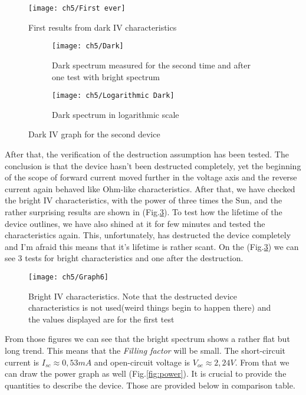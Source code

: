 \begin{figure}
\centering
\texttt{[image: ch5/First ever]}
\caption{First results from dark IV characteristics}
\label{fig:firstever}
\end{figure}

\begin{figure}
\centering
\begin{subfigure}[b]{0.83\textwidth}
\centering
\texttt{[image: ch5/Dark]}
\caption{Dark spectrum measured for the second time and after one test with bright spectrum}
\end{subfigure}

\hfill

\begin{subfigure}[b]{0.83\textwidth}
\centering
\texttt{[image: ch5/Logarithmic Dark]}
\caption{Dark spectrum in logarithmic scale}
\end{subfigure}

\caption{Dark IV graph for the second device}
\label{fig:dark}
\end{figure}

After that, the verification of the destruction assumption has been tested. The conclusion is that the device hasn't been destructed completely, yet the beginning of the scope of forward current moved further in the voltage axis and the reverse current again behaved like Ohm-like characteristics. After that, we have checked the bright IV characteristics, with the power of three times the Sun, and the rather surprising results are shown in (Fig.\ref{fig:bright}). To test how the lifetime of the device outlines, we have also shined at it for few minutes and tested the characteristics again. This, unfortunately, has destructed the device completely and I'm afraid this means that it's lifetime is rather scant. On the (Fig.\ref{fig:bright}) we can see 3 tests for bright characteristics and one after the destruction. 

\begin{figure}
\centering
\texttt{[image: ch5/Graph6]}
\caption{Bright IV characteristics. Note that the destructed device characteristics is not used(weird things begin to happen there) and the values displayed are for the first test}
\label{fig:bright}
\end{figure}

From those figures we can see that the bright spectrum shows a rather flat but long trend. This means that the \textit{Filling factor} will be small. The short-circuit current is $I_{sc} \approx 0,53mA$ and open-circuit voltage is $V_{oc} \approx 2,24V$. From that we can draw the power graph as well (Fig.\ref{fig:power}). It is crucial to provide the quantities to describe the device. Those are provided below in comparison table.


